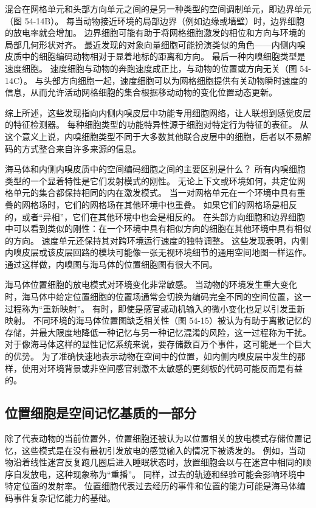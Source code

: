 混合在网格单元和头部方向单元之间的是另一种类型的空间调制单元，即边界单元（图 54-14B）。 每当动物接近环境的局部边界（例如边缘或墙壁）时，边界细胞的放电率就会增加。 边界细胞可能有助于将网格细胞激发的相位和方向与环境的局部几何形状对齐。 最近发现的对象向量细胞可能扮演类似的角色——内侧内嗅皮质中的细胞编码动物相对于显着地标的距离和方向。 最后一种内嗅细胞类型是速度细胞。 速度细胞与动物的奔跑速度成正比，与动物的位置或方向无关（图 54-14C）。 与头部方向细胞一起，速度细胞可以为网格细胞提供有关动物瞬时速度的信息，从而允许活动网格细胞的集合根据移动动物的变化位置动态更新。

综上所述，这些发现指向内侧内嗅皮层中功能专用细胞网络，让人联想到感觉皮层的特征检测器。 每种细胞类型的功能特异性源于细胞对特定行为特征的表征。 从这个意义上说，内嗅细胞类型不同于大多数其他联合皮层中的细胞，后者以不易解码的方式整合来自许多来源的信息。

海马体和内侧内嗅皮质中的空间编码细胞之间的主要区别是什么？ 所有内嗅细胞类型的一个显着特性是它们发射模式的刚性。 无论上下文或环境如何，共定位网格单元的集合都保持相同的内在激发模式。 当一对网格单元在一个环境中具有重叠的网格场时，它们的网格场在其他环境中也重叠。 如果它们的网格场是相反的，或者“异相”，它们在其他环境中也会是相反的。 在头部方向细胞和边界细胞中可以看到类似的刚性：在一个环境中具有相似方向的细胞在其他环境中具有相似的方向。 速度单元还保持其对跨环境运行速度的独特调整。 这些发现表明，内侧内嗅皮层或该皮层回路的模块可能像一张无视环境细节的通用空间地图一样运作。 通过这样做，内嗅图与海马体的位置细胞图有很大不同。

海马体位置细胞的放电模式对环境变化非常敏感。 当动物的环境发生重大变化时，海马体中给定位置细胞的位置场通常会切换为编码完全不同的空间位置，这一过程称为“重新映射”。 有时，即使是感官或动机输入的微小变化也足以引发重新映射。 不同环境的海马体位置图缺乏相关性（图 54-15）被认为有助于离散记忆的存储，并最大限度地降低一种记忆与另一种记忆混淆的风险，这一过程称为干扰。 对于像海马体这样的显性记忆系统来说，要存储数百万个事件，这可能是一个巨大的优势。 为了准确快速地表示动物在空间中的位置，如内侧内嗅皮层中发生的那样，使用对环境背景或非空间感官刺激不太敏感的更刻板的代码可能反而是有益的。

\subsection{位置细胞是空间记忆基质的一部分}

除了代表动物的当前位置外，位置细胞还被认为以位置相关的放电模式存储位置记忆，这些模式是在没有最初引发放电的感觉输入的情况下被诱发的。 例如，当动物沿着线性迷宫反复跑几圈后进入睡眠状态时，放置细胞会以与在迷宫中相同的顺序自发放电，这种现象称为“重播”。 同样，过去的轨迹和经验可能会影响环境中特定位置的发射率。 位置细胞代表过去经历的事件和位置的能力可能是海马体编码事件复杂记忆能力的基础。

